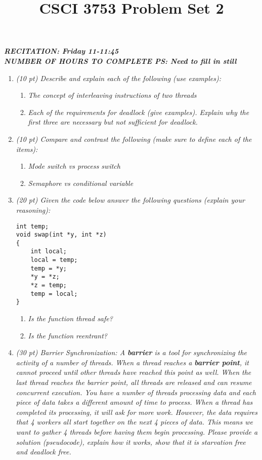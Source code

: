 \documentclass[12pt]{article}
\title{CSCI 3753 Problem Set 2}
\begin{document}

\textbf{\textit{RECITATION: Friday 11-11:45}}\\
\textbf{\textit{NUMBER OF HOURS TO COMPLETE PS: Need to fill in still}}

\begin{enumerate}
\item{\textit{(10 pt) Describe and explain each of the following (use examples):}}
\begin{enumerate}
\item{\textit{The concept of interleaving instructions of two threads}}
\item{\textit{Each of the requirements for deadlock (give examples). Explain why the first three are necessary but not sufficient for deadlock.}}
\end{enumerate}

\item{\textit{(10 pt) Compare and contrast the following (make sure to define each of the items):}}
\begin{enumerate}
\item{\textit{Mode switch vs process switch}}
\item{\textit{Semaphore vs conditional variable}}
\end{enumerate}

\item{\textit{(20 pt) Given the code below answer the following questions (explain your reasoning):}}
\begin{small}
\begin{Verbatim}[xleftmargin=5mm]
int temp;
void swap(int *y, int *z)
{
    int local;
    local = temp;
    temp = *y;
    *y = *z;
    *z = temp;
    temp = local;
}
\end{Verbatim}
\end{small}
\begin{enumerate}
\item{\textit{Is the function thread safe?}}
\item{\textit{Is the function reentrant?}}
\end{enumerate}

\item{\textit{(30 pt) Barrier Synchronization: A \textbf{barrier} is a tool for synchronizing the activity of a number of threads. When a thread reaches a \textbf{barrier point}, it cannot proceed until other threads have reached this point as well. When the last thread reaches the barrier point, all threads are released and can resume concurrent execution. 
You have a number of threads processing data and each piece of data takes a different amount of time to process. When a thread has completed its processing, it will ask for more work. However, the data requires that 4 workers all start together on the next 4 pieces of data. This means we want to gather 4 threads before having them begin processing. 
Please provide a solution (pseudocode), explain how it works, show that it is starvation free and deadlock free.}}


\end{enumerate}
\end{document}
